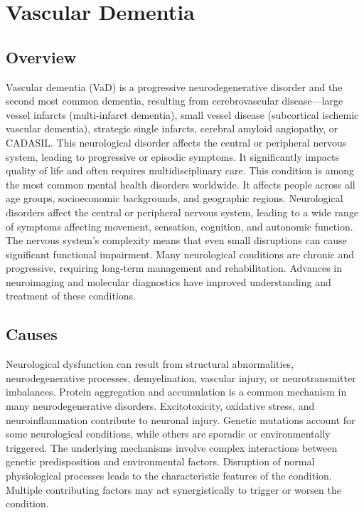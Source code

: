 \chapter{Vascular Dementia}
\label{sec:Vascular Dementia}

\section{Overview}
Vascular dementia (VaD) is a progressive neurodegenerative disorder and the second most common dementia, resulting from cerebrovascular disease---large vessel infarcts (multi-infarct dementia), small vessel disease (subcortical ischemic vascular dementia), strategic single infarcts, cerebral amyloid angiopathy, or CADASIL. This neurological disorder affects the central or peripheral nervous system, leading to progressive or episodic symptoms. It significantly impacts quality of life and often requires multidisciplinary care. This condition is among the most common mental health disorders worldwide. It affects people across all age groups, socioeconomic backgrounds, and geographic regions. Neurological disorders affect the central or peripheral nervous system, leading to a wide range of symptoms affecting movement, sensation, cognition, and autonomic function. The nervous system's complexity means that even small disruptions can cause significant functional impairment. Many neurological conditions are chronic and progressive, requiring long-term management and rehabilitation. Advances in neuroimaging and molecular diagnostics have improved understanding and treatment of these conditions.
\section{Causes}
Neurological dysfunction can result from structural abnormalities, neurodegenerative processes, demyelination, vascular injury, or neurotransmitter imbalances. Protein aggregation and accumulation is a common mechanism in many neurodegenerative disorders. Excitotoxicity, oxidative stress, and neuroinflammation contribute to neuronal injury. Genetic mutations account for some neurological conditions, while others are sporadic or environmentally triggered. The underlying mechanisms involve complex interactions between genetic predisposition and environmental factors. Disruption of normal physiological processes leads to the characteristic features of the condition. Multiple contributing factors may act synergistically to trigger or worsen the condition.
